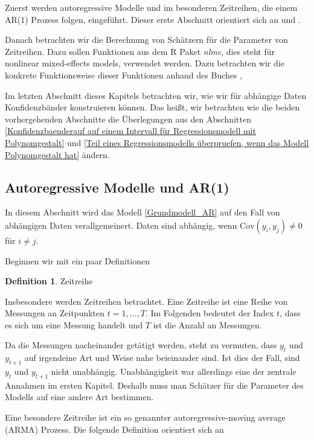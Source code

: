 \documentclass[12pt,a4paper]{article}
\theoremstyle{definition}
\newtheorem{Definition}{Definition}[subsection]
\theoremstyle{definition}
\theoremstyle{definition}
\theoremstyle{definition}
\begin{document}
Zuerst werden autoregressive Modelle und im besonderen Zeitreihen, die einem AR(1) Prozess folgen, eingeführt. Dieser erste Abschnitt orientiert sich an \cite{Hansen15} und \cite{Brockwell91}.

Danach betrachten wir die Berechnung von Schätzern für die Parameter von Zeitreihen. Dazu sollen Funktionen aus dem R Paket \textit{nlme}, dies steht für nonlinear mixed-effects models, verwendet werden. Dazu betrachten wir die konkrete Funktionsweise dieser Funktionen anhand des Buches \cite{Pinheiro00},

Im letzten Abschnitt dieses Kapitels betrachten wir, wie wir für abhängige Daten Konfidenzbänder konstruieren können. Das heißt, wir betrachten wie die beiden vorhergehenden Abschnitte die Überlegungen aus den Abschnitten \ref{Konfidenzbaenderauf auf einem Intervall für Regressionsmodell mit Polynomgestalt} und \ref{Teil eines Regressionsmodells überpruefen, wenn das Modell Polynomgestalt hat} ändern.


\subsection{Autoregressive Modelle und AR(1)}
\label{Regression für AR(1)}
In diesem Abschnitt wird das Modell \eqref{Grundmodell_AR} auf den Fall von abhängigen Daten verallgemeinert. Daten sind abhängig, wenn $\text{Cov}(y_i,y_j) \neq 0$ für $i \neq j$.

Beginnen wir mit ein paar Definitionen

\begin{Definition}
Zeitreihe

Insbesondere werden Zeitreihen betrachtet. Eine Zeitreihe ist eine Reihe von Messungen an Zeitpunkten $ t=1, \ldots, T $. Im Folgenden bedeutet der Index $t$, dass es sich um eine Messung handelt und $T$ ist die Anzahl an Messungen. 

Da die Messungen nacheinander getätigt werden, steht zu vermuten, dass $y_t$ und $y_{t+1}$ auf irgendeine Art und Weise nahe beieinander sind. Ist dies der Fall, sind $y_t$ und $y_{t+1}$ nicht unabhängig. Unabhängigkeit war allerdings eine der zentrale Annahmen im ersten Kapitel. Deshalb muss man Schätzer für die Parameter des Modells auf eine andere Art bestimmen.
\end{Definition}

Eine besondere Zeitreihe ist ein so genannter autoregressive-moving average (ARMA) Prozess. Die folgende Definition orientiert sich an \cite[78]{Brockwell91}
\end{document}
